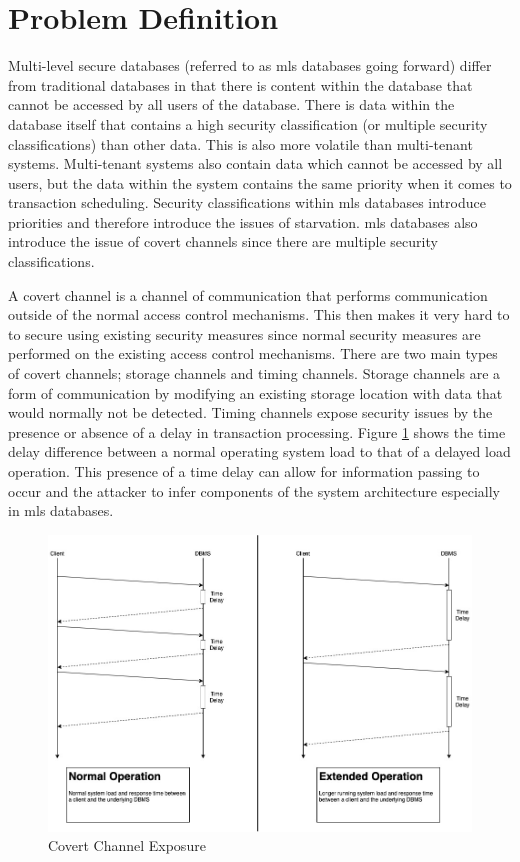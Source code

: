 \section{Problem Definition}
\label{mls:problem_definition}

Multi-level secure databases (referred to as \gls{mls} databases going forward) differ from traditional databases in that there is content within the database that cannot be accessed by all users of the database. There is data within the database itself that contains a high security classification (or multiple security classifications) than other data. This is also more volatile than multi-tenant systems. Multi-tenant systems also contain data which cannot be accessed by all users, but the data within the system contains the same priority when it comes to transaction scheduling. Security classifications within \gls{mls} databases introduce priorities and therefore introduce the issues of starvation. \gls{mls} databases also introduce the issue of covert channels since there are multiple security classifications. 

A covert channel is a channel of communication that performs communication outside of the normal access control mechanisms. This then makes it very hard to to secure using existing security measures since normal security measures are performed on the existing access control mechanisms. There are two main types of covert channels; storage channels and timing channels. Storage channels are a form of communication by modifying an existing storage location with data that would normally not be detected. Timing channels expose security issues by the presence or absence of a delay in transaction processing. Figure \ref{fig:covert_channel_exposure} shows the time delay difference between a normal operating system load to that of a delayed load operation. This presence of a time delay can allow for information passing to occur and the attacker to infer components of the system architecture especially in \gls{mls} databases.

\begin{figure}
\centering
\includegraphics[scale=0.45]{images/CovertTimingChannel.jpg}
\caption{Covert Channel Exposure}
\label{fig:covert_channel_exposure}
\end{figure}

